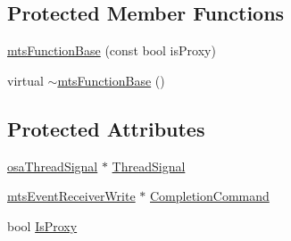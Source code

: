 \subsection*{Protected Member Functions}
\begin{DoxyCompactItemize}
\item 
\hyperlink{classmts_function_base_a86adc9f819ff393fedaeacfa8f35d819}{mts\-Function\-Base} (const bool is\-Proxy)
\item 
virtual \hyperlink{classmts_function_base_a1f931af234c1d55a2e63991daff7d2d7}{$\sim$mts\-Function\-Base} ()
\end{DoxyCompactItemize}
\subsection*{Protected Attributes}
\begin{DoxyCompactItemize}
\item 
\hyperlink{classosa_thread_signal}{osa\-Thread\-Signal} $\ast$ \hyperlink{classmts_function_base_a82055587f9a8d1d159c9b82da0bd7a16}{Thread\-Signal}
\item 
\hyperlink{classmts_event_receiver_write}{mts\-Event\-Receiver\-Write} $\ast$ \hyperlink{classmts_function_base_aac5ad76cb069380fab633207c162f8d7}{Completion\-Command}
\item 
bool \hyperlink{classmts_function_base_a9133290975dc1a3e0880bd72c5f975dc}{Is\-Proxy}
\end{DoxyCompactItemize}


